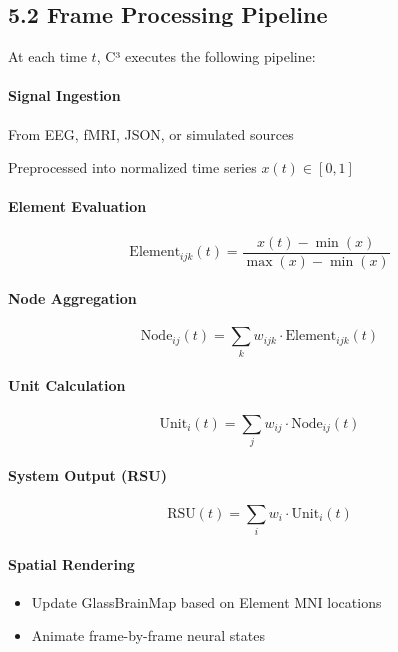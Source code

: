 \subsection*{5.2 Frame Processing Pipeline}

At each time $t$, C³ executes the following pipeline:

\paragraph{Signal Ingestion}
From EEG, fMRI, JSON, or simulated sources

Preprocessed into normalized time series $x(t) \in [0, 1]$

\paragraph{Element Evaluation}

\[
\text{Element}_{ijk}(t) = \frac{x(t) - \min(x)}{\max(x) - \min(x)}
\]

\paragraph{Node Aggregation}

\[
\text{Node}_{ij}(t) = \sum_k w_{ijk} \cdot \text{Element}_{ijk}(t)
\]

\paragraph{Unit Calculation}

\[
\text{Unit}_i(t) = \sum_j w_{ij} \cdot \text{Node}_{ij}(t)
\]

\paragraph{System Output (RSU)}

\[
\text{RSU}(t) = \sum_i w_i \cdot \text{Unit}_i(t)
\]

\paragraph{Spatial Rendering}

\begin{itemize}
    \item Update GlassBrainMap based on Element MNI locations
    \item Animate frame-by-frame neural states
\end{itemize}

